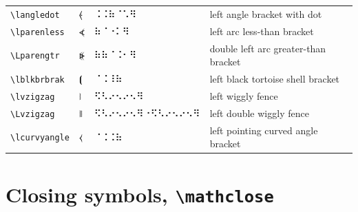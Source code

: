 \documentclass[oneside]{article}
\begin{document}
\begin{longtable}{llll}
\verb|\langledot| & $\langledot$ &  ⠨⠨⠷⠈⠡⠻  & {left angle bracket with dot} \\[2ex]
\verb|\lparenless| & $\lparenless$ &  ⠷⠈⠐⠅⠻  & {left arc less-than bracket} \\[2ex]
\verb|\Lparengtr| & $\Lparengtr$ &  ⠷⠷⠈⠨⠂⠻  & {double left arc greater-than bracket} \\[2ex]
\verb|\lblkbrbrak| & $\lblkbrbrak$ &  ⠈⠨⠸⠷  & {left black tortoise shell bracket} \\[2ex]
\verb|\lvzigzag| & $\lvzigzag$ &  ⠫⠣⠔⠢⠔⠢⠻  & {left wiggly fence} \\[2ex]
\verb|\Lvzigzag| & $\Lvzigzag$ &  ⠫⠣⠔⠢⠔⠢⠻⠐⠫⠣⠔⠢⠔⠢⠻  & {left double wiggly fence} \\[2ex]
\verb|\lcurvyangle| & $\lcurvyangle$ &  ⠈⠨⠨⠷  & {left pointing curved angle bracket} \\[2ex]
\end{longtable}

\clearpage

\section{Closing symbols, \texttt{\textbackslash{}mathclose}}
\end{document}
